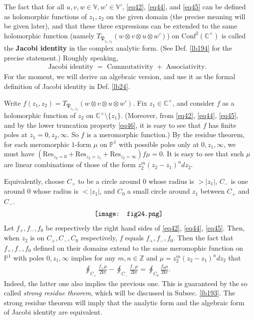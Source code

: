\documentclass[11pt,b5paper,notitlepage]{article}
\theoremstyle{definition}
\theoremstyle{plain}
\newcommand{\fk}{\mathfrak}
\newcommand{\Conf}{\mathrm{Conf}}
\newcommand{\Res}{\mathrm{Res}}
\newcommand{\im}{\mathbf{i}}
\newcommand{\Vbb}{\mathbb V}
\newcommand{\Cbb}{\mathbb C}
\newcommand{\Zbb}{\mathbb Z}
\newcommand{\Pbb}{\mathbb P}
\numberwithin{equation}{section}
\begin{document}
The fact that for all $u,v,w\in\Vbb,w'\in\Vbb'$, \eqref{eq42}, \eqref{eq44}, and \eqref{eq45} can be defined as holomorphic functions of $z_1,z_2$ on the given domain (the precise meaning will be given later), and that these three expressions can be extended to the same holomorphic function (namely $T_{\fk P_{z_1,z_2}}(w\otimes v\otimes u\otimes w')$) on $\Conf^2(\Cbb^\times)$ is called the \textbf{Jacobi identity} in the complex analytic form. (See Def. \ref{lb194} for the precise statement.) Roughly speaking,
\begin{align}
\text{Jacobi identity $=$ Commutativity $+$ Associativity}.\label{eq73}
\end{align}
For the moment, we will derive an algebraic version, and use it as the formal definition of Jacobi identity in Def. \ref{lb24}. 

Write $f(z_1,z_2)=T_{\fk P_{z_1,z_2}}(w\otimes v\otimes u\otimes w')$.  Fix $z_1\in \Cbb^\times$, and consider $f$ as a holomorphic function of $z_2$ on $\Cbb^\times\setminus\{z_1\}$. (Moreover, from \eqref{eq42}, \eqref{eq44}, \eqref{eq45}, and by the lower truncation property \eqref{eq46}, it is easy to see that $f$ has finite poles at $z_1=0,z_2,\infty$. So $f$ is a meromorphic function.) By the residue theorem, for each meromorphic  $1$-form $\mu$ on $\Pbb^1$ with possible poles only at $0,z_1,\infty$, we must have $(\Res_{z_2=0}+\Res_{z_2=z_1}+\Res_{z_2=\infty})f\mu=0$. It is easy to see that such $\mu$ are linear combinations of those of the form $z_2^m(z_2-z_1)^ndz_2$.

Equivalently, choose $C_+$ to be a circle around $0$ whose radius is  $>|z_1|$, $C_-$ is one around $0$ whose radius is $<|z_1|$, and $C_0$  a small circle around $z_1$ between $C_+$ and $C_-$. 
\begin{align*}
	\vcenter{\hbox{{
				\texttt{[image: fig24.png]}}}}
\end{align*}
Let $f_+,f_-,f_0$ be respectively the right hand sides of \eqref{eq42}, \eqref{eq44}, \eqref{eq45}. Then, when $z_2$ is on $C_+,C_-,C_0$ respectively, $f$ equals $f_+,f_-,f_0$. Then the fact that $f_+,f_-,f_0$ defined on their domains extend to the same meromophic function on $\Pbb^1$ with poles $0,z_1,\infty$ implies for any $m,n\in\Zbb$ and $\mu=z_2^m(z_2-z_1)^ndz_2$ that
\begin{align}
	\oint_{C_+}\frac{f_+\mu}{2\im\pi} -\oint_{C_-}\frac{f_-\mu}{2\im\pi}=\oint_{C_0} \frac{f_0\mu}{2\im\pi}.\label{eq48}
\end{align}
Indeed, the latter one also implies the previous one. This is guaranteed by the so called \emph{strong residue theorem}, which will be discussed in Subsec. \ref{lb193}. The strong residue theorem will imply that the analytic form and the algebraic form of Jacobi identity are equivalent.
\end{document}
